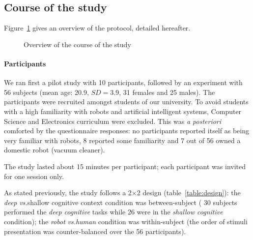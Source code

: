 \documentclass[lettersize, noapacite, twoside, HRI]{apa_HRI}
\newcommand{\vs}{\textit{vs.}\xspace}
\begin{document}
\subsection{Course of the study}

Figure~\ref{course_of_study} gives an overview of the protocol, detailed
hereafter.

\begin{figure}[ht]
\centering

    \caption{Overview of the course of the study}
    \label{course_of_study}
\end{figure}
\paragraph{Participants}

We ran first a pilot study with 10 participants, followed by an experiment with
56 subjects (mean age: 20.9, $SD=3.9$, 31 females and 25 males).
The participants were recruited amongst students of our university. To avoid
students with a high familiarity with robots and artificial intelligent systems,
Computer Science and Electronics curriculum were excluded. This was \textit{a
posteriori} comforted by the questionnaire responses: no participants
reported itself as being very familiar with robots, 8 reported some familiarity
and 7 out of 56 owned a domestic robot (vacuum cleaner).

The study lasted about 15 minutes per participant; each participant was invited
for one session only.

As stated previously, the study follows a 2$\times$2 design
(table~\ref{table:design}): the \emph{deep} \vs {shallow cognitive context}
condition was between-subject ( 30 subjects performed the \emph{deep cognitive}
tasks while 26 were in the \emph{shallow cognitive} condition); the \emph{robot}
\vs \emph{human} condition was within-subject (the order of stimuli presentation
was counter-balanced over the 56 participants).
\end{document}
